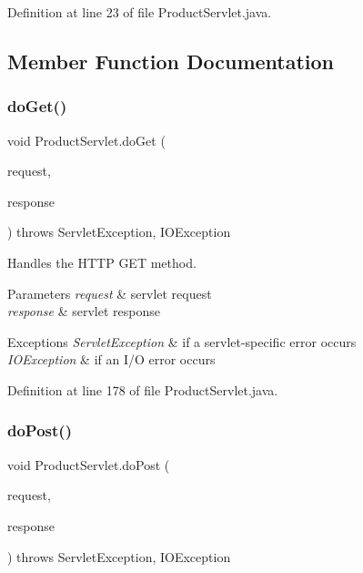 Definition at line 23 of file Product\+Servlet.\+java.



\subsection{Member Function Documentation}
\mbox{\label{class_product_servlet_a257ee7ed299fc9a1cf2d1061b4051d99}} 
\subsubsection{\texorpdfstring{doGet()}{doGet()}}
{\footnotesize\ttfamily void Product\+Servlet.\+do\+Get (\begin{DoxyParamCaption}\item[{Http\+Servlet\+Request}]{request,  }\item[{Http\+Servlet\+Response}]{response }\end{DoxyParamCaption}) throws Servlet\+Exception, I\+O\+Exception\hspace{0.3cm}{\ttfamily [protected]}}

Handles the H\+T\+TP {\ttfamily G\+ET} method.


\begin{DoxyParams}{Parameters}
{\em request} & servlet request \\
\hline
{\em response} & servlet response \\
\hline
\end{DoxyParams}

\begin{DoxyExceptions}{Exceptions}
{\em Servlet\+Exception} & if a servlet-\/specific error occurs \\
\hline
{\em I\+O\+Exception} & if an I/O error occurs \\
\hline
\end{DoxyExceptions}


Definition at line 178 of file Product\+Servlet.\+java.

\mbox{\label{class_product_servlet_a5dce61b053b3935394535410a9da3192}} 
\subsubsection{\texorpdfstring{doPost()}{doPost()}}
{\footnotesize\ttfamily void Product\+Servlet.\+do\+Post (\begin{DoxyParamCaption}\item[{Http\+Servlet\+Request}]{request,  }\item[{Http\+Servlet\+Response}]{response }\end{DoxyParamCaption}) throws Servlet\+Exception, I\+O\+Exception\hspace{0.3cm}{\ttfamily [protected]}}

